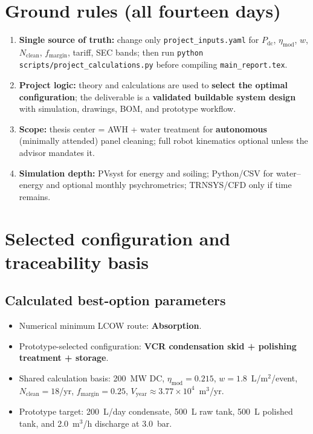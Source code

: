 \documentclass[11pt,a4paper]{article}
\begin{document}
\section{Ground rules (all fourteen days)}
\begin{enumerate}[leftmargin=*]
  \item \textbf{Single source of truth:} change only \texttt{project\_inputs.yaml} for $P_{\mathrm{dc}}$, $\eta_{\mathrm{mod}}$, $w$, $N_{\mathrm{clean}}$, $f_{\mathrm{margin}}$, tariff, SEC bands; then run \texttt{python scripts/project\_calculations.py} before compiling \texttt{main\_report.tex}.
  \item \textbf{Project logic:} theory and calculations are used to \textbf{select the optimal configuration}; the deliverable is a \textbf{validated buildable system design} with simulation, drawings, BOM, and prototype workflow.
  \item \textbf{Scope:} thesis center = AWH + water treatment for \textbf{autonomous} (minimally attended) panel cleaning; full robot kinematics optional unless the advisor mandates it.
  \item \textbf{Simulation depth:} PVsyst for energy and soiling; Python/CSV for water--energy and optional monthly psychrometrics; TRNSYS/CFD only if time remains.
\end{enumerate}

\section{Selected configuration and traceability basis}
\subsection{Calculated best-option parameters}
\begin{itemize}[leftmargin=*]
  \item Numerical minimum LCOW route: \textbf{Absorption}.
  \item Prototype-selected configuration: \textbf{VCR condensation skid + polishing treatment + storage}.
  \item Shared calculation basis: 200~MW DC, $\eta_{\mathrm{mod}}=0.215$, $w=1.8$~L/m$^2$/event, $N_{\mathrm{clean}}=18$/yr, $f_{\mathrm{margin}}=0.25$, $V_{\mathrm{year}}\approx 3.77\times 10^4$~m$^3$/yr.
  \item Prototype target: 200~L/day condensate, 500~L raw tank, 500~L polished tank, and 2.0~m$^3$/h discharge at 3.0~bar.
\end{itemize}
\end{document}
